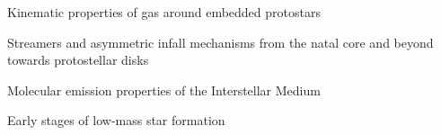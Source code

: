 \vspace{8pt}
\begin{cvitems} %
      \item{Kinematic properties of gas around embedded protostars}
       \item {Streamers and asymmetric infall mechanisms from the natal core and beyond towards protostellar disks}
       \item {Molecular emission properties of the Interstellar Medium}
       \item{Early stages of low-mass star formation}
\end{cvitems}
\vspace{8pt}